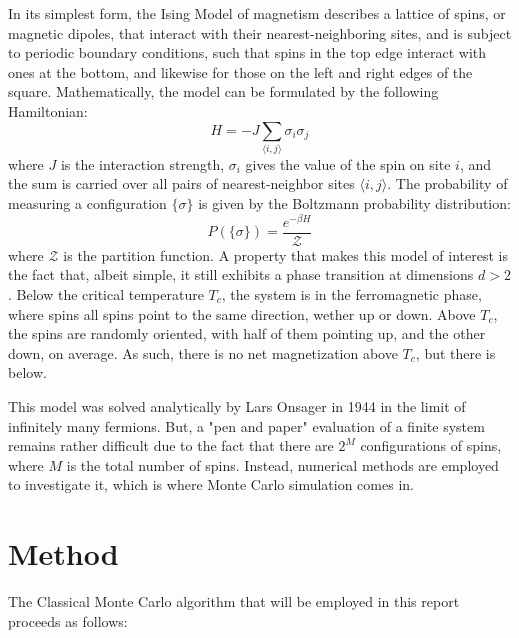 \documentclass[12pt]{article}
\begin{document}
In its simplest form, the Ising Model of magnetism describes a lattice of spins, or magnetic dipoles, that interact with their nearest-neighboring sites, and is subject to periodic boundary conditions, such that spins in the top edge interact with ones at the bottom, and likewise for those on the left and right edges of the square. Mathematically, the model can be formulated by the following Hamiltonian:
%
\begin{equation}
H = -J \sum_{\langle i,j \rangle} \sigma_{i} \sigma_j
\label{eq:ising_hamiltonian}
\end{equation}
%
where $J$ is the interaction strength, $\sigma_i$ gives the value of the spin on site $i$, and the sum is carried over all pairs of nearest-neighbor sites $\langle i,j \rangle$. The probability of measuring a configuration $\lbrace \sigma \rbrace$ is given by the Boltzmann probability distribution:
%
\begin{equation}
P(\lbrace \sigma \rbrace) = \frac{e^{-\beta H}}{\mathcal{Z}}
\end{equation}
\label{eq:probability}
%
where $\mathcal{Z}$ is the partition function. A property that makes this model of interest is the fact that, albeit simple, it still exhibits a phase transition at dimensions $d>2$. Below the critical temperature $T_c$, the system is in the ferromagnetic phase, where spins all spins point to the same direction, wether up or down. Above $T_c$, the spins are randomly oriented, with half of them pointing up, and the other down, on average. As such, there is no net magnetization above $T_c$, but there is below.

This model was solved analytically by Lars Onsager in 1944 \cite{PhysRev.65.117} in the limit of infinitely many fermions. But, a "pen and paper" evaluation of a finite system remains rather difficult due to the fact that there are $2^M$ configurations of spins, where $M$ is the total number of spins. Instead, numerical methods are employed to investigate it, which is where Monte Carlo simulation comes in.

\section{Method}

The Classical Monte Carlo algorithm that will be employed in this report proceeds as follows:
\end{document}
